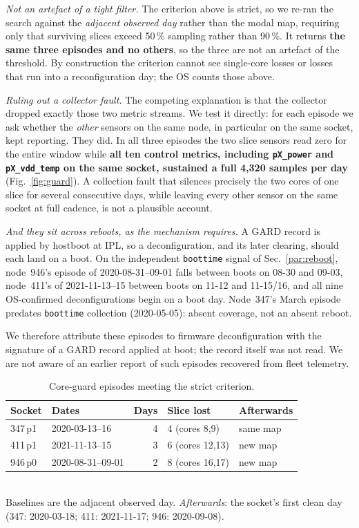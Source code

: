 \documentclass[10pt,conference]{IEEEtran}
\begin{document}
\emph{Not an artefact of a tight filter.} The criterion above is strict, so we re-ran the search
against the \emph{adjacent observed day} rather than the modal map, requiring only that surviving
slices exceed 50\,\% sampling rather than 90\,\%. It returns \textbf{the same three episodes and
no others}, so the three are not an artefact of the threshold. By construction the criterion cannot
see single-core losses or losses that run into a reconfiguration day; the OS counts those above.

\emph{Ruling out a collector fault.} The competing explanation is that the collector dropped
exactly those two metric streams. We test it directly: for each episode we ask whether the
\emph{other} sensors on the same node, in particular on the same socket, kept reporting. They
did. In all three episodes the two slice sensors read zero for the entire window while
\textbf{all ten control metrics, including \texttt{pX\_power} and \texttt{pX\_vdd\_temp} on the
same socket, sustained a full 4{,}320 samples per day} (Fig.~\ref{fig:guard}). A collection fault
that silences precisely the two cores of one slice for several consecutive days, while leaving
every other sensor on the same socket at full cadence, is not a plausible account.

\emph{And they sit across reboots, as the mechanism requires.} A GARD record is applied by
hostboot at IPL, so a deconfiguration, and its later clearing, should each land on a boot. On the
independent \texttt{boottime} signal of Sec.~\ref{par:reboot}, node~946's episode of
2020-08-31--09-01 falls between boots on 08-30 and 09-03, node~411's of 2021-11-13--15 between
boots on 11-12 and 11-15/16, and all nine OS-confirmed deconfigurations begin on a boot day.
Node~347's March episode predates \texttt{boottime} collection (2020-05-05): absent coverage, not
an absent reboot.

We therefore attribute these episodes to firmware deconfiguration with the signature of a GARD
record applied at boot; the record itself was not read. We are not aware of an earlier report of
such episodes recovered from fleet telemetry.

\begin{table}[h]\centering\caption{Core-guard episodes meeting the strict criterion.}\label{tab:guard}
\begin{tabular}{llrll}\toprule
Socket & Dates & Days & Slice lost & Afterwards\\\midrule
347\,p1 & 2020-03-13--16 & 4 & 4 (cores 8,9)   & same map\\
411\,p1 & 2021-11-13--15 & 3 & 6 (cores 12,13) & new map\\
946\,p0 & 2020-08-31--09-01 & 2 & 8 (cores 16,17) & new map\\
\bottomrule\end{tabular}
\\[2pt]\footnotesize Baselines are the adjacent observed day. \emph{Afterwards}: the socket's
first clean day (347: 2020-03-18; 411: 2021-11-17; 946: 2020-09-08).
\end{table}
\end{document}
